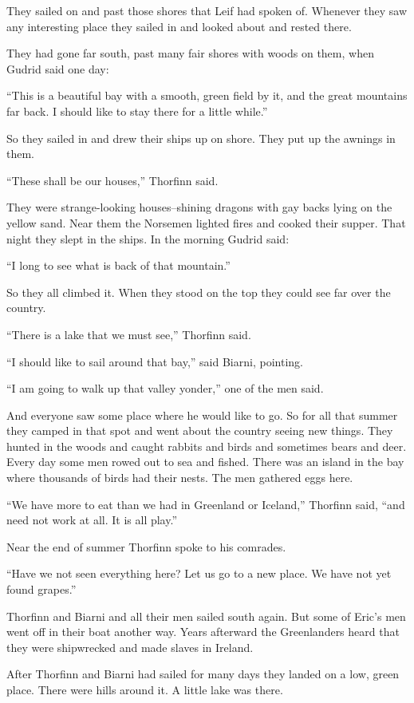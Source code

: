They sailed on and past those shores that Leif had spoken of. Whenever
they saw any interesting place they sailed in and looked about and
rested there.

They had gone far south, past many fair shores with woods on them, when
Gudrid said one day:

``This is a beautiful bay with a smooth, green field by it, and the
great mountains far back. I should like to stay there for a little
while.''

So they sailed in and drew their ships up on shore. They put up the
awnings in them.

``These shall be our houses,'' Thorfinn said.

They were strange-looking houses--shining dragons with gay backs lying
on the yellow sand. Near them the Norsemen lighted fires and cooked
their supper. That night they slept in the ships. In the morning Gudrid
said:

``I long to see what is back of that mountain.''

So they all climbed it. When they stood on the top they could see far
over the country.

``There is a lake that we must see,'' Thorfinn said.

``I should like to sail around that bay,'' said Biarni, pointing.

``I am going to walk up that valley yonder,'' one of the men said.

And everyone saw some place where he would like to go. So for all that
summer they camped in that spot and went about the country seeing new
things. They hunted in the woods and caught rabbits and birds and
sometimes bears and deer. Every day some men rowed out to sea and
fished. There was an island in the bay where thousands of birds had
their nests. The men gathered eggs here.

``We have more to eat than we had in Greenland or Iceland,'' Thorfinn
said, ``and need not work at all. It is all play.''

Near the end of summer Thorfinn spoke to his comrades.

``Have we not seen everything here? Let us go to a new place. We have
not yet found grapes.''

Thorfinn and Biarni and all their men sailed south again. But some of
Eric's men went off in their boat another way. Years afterward the
Greenlanders heard that they were shipwrecked and made slaves in
Ireland.

After Thorfinn and Biarni had sailed for many days they landed on a low,
green place. There were hills around it. A little lake was there.

